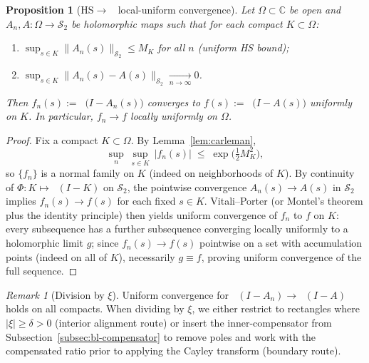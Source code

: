 \documentclass[11pt]{article}
\newtheorem{proposition}[theorem]{Proposition}
\theoremstyle{definition}
\theoremstyle{remark}
\newtheorem{remark}[theorem]{Remark}
\newcommand{\C}{\mathbb{C}}
\newcommand{\HS}{\mathcal{S}_2}
\DeclareMathOperator{\dettwo}{det_2}
\begin{document}
\begin{proposition}[HS\(\to\)\(\dettwo\) local-uniform convergence]\label{prop:HS-to-det2}
Let \(\Omega\subset\C\) be open and \(A_n,A:\Omega\to\HS\) be holomorphic maps such that for each compact \(K\subset\Omega\):
\begin{enumerate}
 \item \(\sup_{s\in K}\|A_n(s)\|_{\HS}\le M_K\) for all \(n\) (uniform HS bound);
 \item \(\sup_{s\in K}\|A_n(s)-A(s)\|_{\HS}\xrightarrow[n\to\infty]{}0\).
\end{enumerate}
Then \(f_n(s):=\dettwo\big(I-A_n(s)\big)\) converges to \(f(s):=\dettwo\big(I-A(s)\big)\) uniformly on \(K\). In particular, \(f_n\to f\) locally uniformly on \(\Omega\).
\end{proposition}
\begin{proof}
Fix a compact \(K\subset\Omega\). By Lemma~\ref{lem:carleman},
\[
 \sup_{n}\ \sup_{s\in K}\ |f_n(s)|\;\le\; \exp\!\Big(\tfrac12 M_K^2\Big),
\]
so \(\{f_n\}\) is a normal family on \(K\) (indeed on neighborhoods of \(K\)). By continuity of \(\Phi:K\mapsto\dettwo(I-K)\) on \(\HS\), the pointwise convergence \(A_n(s)\to A(s)\) in \(\HS\) implies \(f_n(s)\to f(s)\) for each fixed \(s\in K\). Vitali--Porter (or Montel's theorem plus the identity principle) then yields uniform convergence of \(f_n\) to \(f\) on \(K\): every subsequence has a further subsequence converging locally uniformly to a holomorphic limit \(g\); since \(f_n(s)\to f(s)\) pointwise on a set with accumulation points (indeed on all of \(K\)), necessarily \(g\equiv f\), proving uniform convergence of the full sequence.
\end{proof}

\begin{remark}[Division by \(\xi\)]
Uniform convergence for \(\dettwo(I-A_n)\to\dettwo(I-A)\) holds on all compacts. When dividing by \(\xi\), we either restrict to rectangles where \(|\xi|\ge \delta>0\) (interior alignment route) or insert the inner-compensator from Subsection~\ref{subsec:bl-compensator} to remove poles and work with the compensated ratio prior to applying the Cayley transform (boundary route).
\end{remark}
\end{document}
